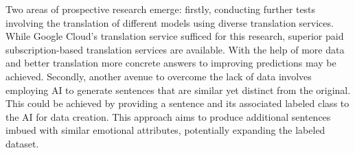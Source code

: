 \documentclass[11pt]{article}
\begin{document}
Two areas of prospective research emerge: firstly, conducting further tests involving the translation of different models using diverse translation services. While Google Cloud's translation service sufficed for this research, superior paid subscription-based translation services are available. With the help of more data and better translation more concrete answers to improving predictions may be achieved. Secondly, another avenue to overcome the lack of data involves employing AI to generate sentences that are similar yet distinct from the original. This could be achieved by providing a sentence and its associated labeled class to the AI for data creation. This approach aims to produce additional sentences imbued with similar emotional attributes, potentially expanding the labeled dataset.

\clearpage
{}
\printbibliography
\clearpage


\listoffigures
\clearpage


\appendix
\end{document}

